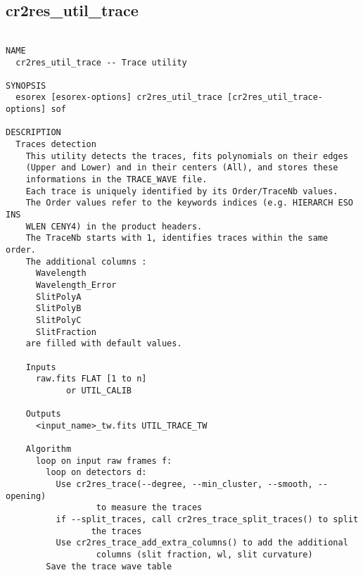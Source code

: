 \subsection{cr2res\_util\_trace}
\begin{verbatim}

NAME
  cr2res_util_trace -- Trace utility

SYNOPSIS
  esorex [esorex-options] cr2res_util_trace [cr2res_util_trace-options] sof

DESCRIPTION
  Traces detection                                                        
    This utility detects the traces, fits polynomials on their edges      
    (Upper and Lower) and in their centers (All), and stores these        
    informations in the TRACE_WAVE file.                                  
    Each trace is uniquely identified by its Order/TraceNb values.        
    The Order values refer to the keywords indices (e.g. HIERARCH ESO INS 
    WLEN CENY4) in the product headers.                                   
    The TraceNb starts with 1, identifies traces within the same order.   
    The additional columns :                                              
      Wavelength                                             
      Wavelength_Error                                       
      SlitPolyA                                            
      SlitPolyB                                            
      SlitPolyC                                            
      SlitFraction                                          
    are filled with default values.                                       
                                                                          
    Inputs                                                                
      raw.fits FLAT [1 to n]                               
            or UTIL_CALIB                              
                                                                          
    Outputs                                                               
      <input_name>_tw.fits UTIL_TRACE_TW                
                                                                          
    Algorithm                                                             
      loop on input raw frames f:                                         
        loop on detectors d:                                              
          Use cr2res_trace(--degree, --min_cluster, --smooth, --opening)  
                  to measure the traces                                   
          if --split_traces, call cr2res_trace_split_traces() to split    
                 the traces                                               
          Use cr2res_trace_add_extra_columns() to add the additional      
                  columns (slit fraction, wl, slit curvature)             
        Save the trace wave table                                         
                                                                          

\end{verbatim}
